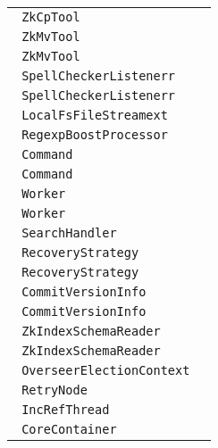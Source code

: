 \begin{center}
\begin{tabular}{ll}
\lstinline/ ZkCpTool/&\raisebox{0pt}{\lstinline/   runImpl(CommandLine)/}\\ 
\lstinline/ ZkMvTool/&\raisebox{0pt}{\lstinline/   runImpl(CommandLine)/}\\ 
\lstinline/ ZkMvTool/&\raisebox{0pt}{\lstinline/   runImpl(CommandLine)/}\\ 
\lstinline/ SpellCheckerListenerr/&\raisebox{0pt}{\lstinline/   buildSpellIndex(SolrIndexSearch)/}\\ 
\lstinline/ SpellCheckerListenerr/&\raisebox{0pt}{\lstinline/   buildSpellIndex(SolrIndexSearch)/}\\ 
\lstinline/ LocalFsFileStreamext/&\raisebox{0pt}{\lstinline/   write(out)/}\\ 
\lstinline/ RegexpBoostProcessor/&\raisebox{0pt}{\lstinline/  initBoostEntries(InputStream)/}\\ 
\lstinline/ Command/&\raisebox{0pt}{\lstinline/   handleCommands(List<CommandOperation>)/}\\ 
\lstinline/ Command/&\raisebox{0pt}{\lstinline/   handleCommands(List<CommandOperation>)/}\\ 
\lstinline/ Worker/&\raisebox{0pt}{\lstinline/   run()/}\\ 
\lstinline/ Worker/&\raisebox{0pt}{\lstinline/   run()/}\\ 
\lstinline/ SearchHandler/&\raisebox{0pt}{\lstinline/   handleRequestBody()/}\\ 
\lstinline/ RecoveryStrategy/&\raisebox{0pt}{\lstinline/   replay(SolrCore)/}\\ 
\lstinline/ RecoveryStrategy/&\raisebox{0pt}{\lstinline/   replay(SolrCore)/}\\ 
\lstinline/ CommitVersionInfo/&\raisebox{0pt}{\lstinline/   CommitVersionInfobuild(IndexCommit)/}\\ 
\lstinline/ CommitVersionInfo/&\raisebox{0pt}{\lstinline/   CommitVersionInfobuild(IndexCommit)/}\\ 
\lstinline/ ZkIndexSchemaReader/&\raisebox{0pt}{\lstinline/   command()/}\\ 
\lstinline/ ZkIndexSchemaReader/&\raisebox{0pt}{\lstinline/   command()/}\\ 
\lstinline/ OverseerElectionContext/&\raisebox{0pt}{\lstinline/   runLeaderProcess(boolean)/}\\ 
\lstinline/ RetryNode/&\raisebox{0pt}{\lstinline/   booleancheckRetry()/}\\ 
\lstinline/ IncRefThread/&\raisebox{0pt}{\lstinline/   run()/}\\ 
\lstinline/ CoreContainer/&\raisebox{0pt}{\lstinline/   swap(String,String)/}\\ 

\end{tabular}
\end{center}
